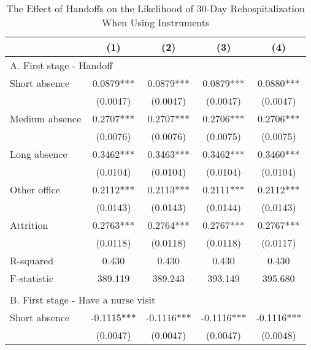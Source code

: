 \documentclass[final,12pt, notitlepage]{article}
\begin{document}
\begin{singlespace}
\newpage
\begin{table}[H]
\footnotesize
\setlength\tabcolsep{0pt}
\centering
\caption{The Effect of Handoffs on the Likelihood of 30-Day Rehospitalization When Using Instruments}
\label{tab:iv30}
\begin{threeparttable}
{
\def\sym#1{\ifmmode^{#1}\else\(^{#1}\)\fi}
\begin{tabular*}{\textwidth}{l@{\extracolsep{\fill}}*{4}{c}} %
\toprule
                    &\multicolumn{1}{c}{(1)}&\multicolumn{1}{c}{(2)}&\multicolumn{1}{c}{(3)}&\multicolumn{1}{c}{(4)}\\
\midrule
\multicolumn{5}{l}{A. First stage - Handoff} \\
Short absence       &      0.0879***&      0.0879***&      0.0879***&      0.0880***\\
                    &    (0.0047)   &    (0.0047)   &    (0.0047)   &    (0.0047)   \\
Medium absence      &      0.2707***&      0.2707***&      0.2706***&      0.2706***\\
                    &    (0.0076)   &    (0.0076)   &    (0.0075)   &    (0.0075)   \\
Long absence        &      0.3462***&      0.3463***&      0.3462***&      0.3460***\\
                    &    (0.0104)   &    (0.0104)   &    (0.0104)   &    (0.0104)   \\
Other office        &      0.2112***&      0.2113***&      0.2111***&      0.2112***\\
                    &    (0.0143)   &    (0.0143)   &    (0.0144)   &    (0.0143)   \\
Attrition           &      0.2763***&      0.2764***&      0.2767***&      0.2767***\\
                    &    (0.0118)   &    (0.0118)   &    (0.0118)   &    (0.0117)   \\
R-squared           &      0.430   &      0.430   &      0.430   &      0.430   \\
F-statistic         &    389.119   &    389.243   &    393.149   &    395.680   \\
\\
\multicolumn{5}{l}{B. First stage - Have a nurse visit} \\
Short absence       &     -0.1115***&     -0.1116***&     -0.1116***&     -0.1116***\\
                    &    (0.0047)   &    (0.0047)   &    (0.0047)   &    (0.0048)   \\

\end{tabular*}}
\end{threeparttable}
\end{table}
\end{singlespace}
\end{document}
